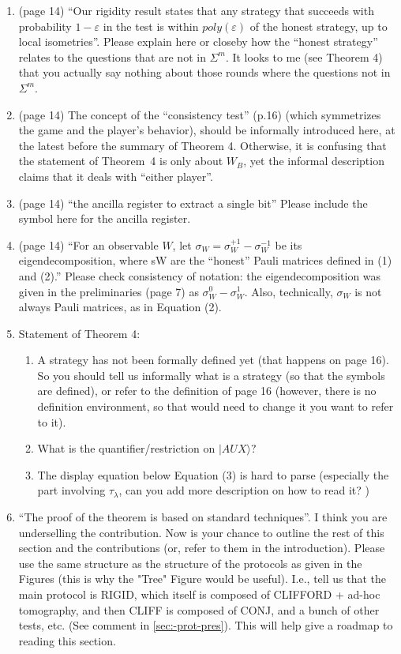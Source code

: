 \documentclass[12pt]{article}
\begin{document}
\begin{enumerate}
    \item (page 14) ``Our rigidity result states that any strategy that succeeds with probability $1-\varepsilon$ in the test is within $poly(\varepsilon)$ of
the honest strategy, up to local isometries''. Please explain here or closeby how the ``honest strategy'' relates to the questions that are not in $\Sigma^m$. It looks to me (see Theorem 4) that you actually say nothing about those rounds where the questions not in  $\Sigma^m$.
\item (page 14) The concept of the ``consistency test'' (p.16) (which symmetrizes the game and the player's behavior), should be informally introduced here, at the latest before the summary of Theorem 4. Otherwise, it is confusing that the statement of Theorem~4 is only about $W_B$, yet the informal description claims that it deals with ``either player''.
    \item (page 14) ``the ancilla register to extract a single bit'' Please include the symbol here for the ancilla register.
        \item (page 14) ``For an observable $W$, let $\sigma_W = \sigma_W^{+1}-\sigma_W^{-1}$ be its eigendecomposition, where sW are the “honest”
Pauli matrices defined in (1) and (2).'' Please check consistency of notation: the eigendecomposition was given in the preliminaries (page 7) as $\sigma_W^{0}-\sigma_W^{1}$. Also, technically, $\sigma_W$ is not always Pauli matrices, as in Equation (2).
\item Statement of Theorem 4:
\begin{enumerate}
\item A strategy has not been formally defined yet (that happens on page 16). So you should tell us informally what is a strategy (so that the symbols are defined), or refer to the definition of page 16 (however, there is no definition environment, so that would need to change it you want to refer to it).
 \item What is the quantifier/restriction on $|AUX\rangle?$
 \item   The display equation below Equation (3) is hard to parse (especially the part involving $\tau_\lambda$, can you add more description on how to read it? )
\end{enumerate}
\item ``The proof of the theorem is based on standard techniques''. I think you are underselling the contribution. Now is your chance to outline the rest of this section and the contributions (or, refer to them in the introduction). Please use the same structure as the structure of the protocols as given in the Figures (this is why the "Tree" Figure would be useful). I.e., tell us that the main protocol is RIGID, which itself is composed of CLIFFORD + ad-hoc tomography, and then CLIFF is composed of CONJ, and a bunch of other tests, etc. (See comment in \ref{sec:-prot-pres}). This will help give a roadmap to reading this section.

\end{enumerate}
\end{document}
